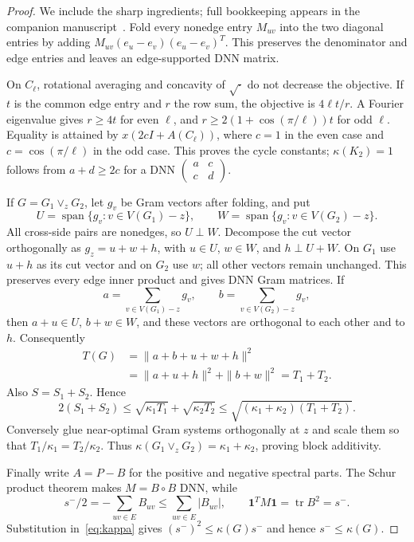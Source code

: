 \documentclass[11pt]{article}
\theoremstyle{remark}
\newcommand{\tr}{\operatorname{tr}}
\newcommand{\one}{\mathbf 1}
\begin{document}
\begin{proof}
We include the sharp ingredients; full bookkeeping appears in the companion
manuscript~\cite{SharpDNN}.  Fold every nonedge entry $M_{uv}$ into the two
diagonal entries by adding $M_{uv}(e_u-e_v)(e_u-e_v)^T$.  This preserves the
denominator and edge entries and leaves an edge-supported DNN matrix.

On $C_\ell$, rotational averaging and concavity of $\sqrt{\cdot}$ do not
decrease the objective.  If $t$ is the common edge entry and $r$ the row sum,
the objective is $4\ell t/r$.  A Fourier eigenvalue gives $r\geq4t$ for even
$\ell$, and $r\geq2(1+\cos(\pi/\ell))t$ for odd $\ell$.  Equality is attained
by $x(2cI+A(C_\ell))$, where $c=1$ in the even case and
$c=\cos(\pi/\ell)$ in the odd case.  This proves the cycle constants;
$\kappa(K_2)=1$ follows from $a+d\geq2c$ for a DNN
$\left(\begin{smallmatrix}a&c\\c&d\end{smallmatrix}\right)$.

If $G=G_1\vee_zG_2$, let $g_v$ be Gram vectors after folding, and put
\[
 U=\operatorname{span}\{g_v:v\in V(G_1)-z\},\qquad
 W=\operatorname{span}\{g_v:v\in V(G_2)-z\}.
\]
All cross-side pairs are nonedges, so $U\perp W$.  Decompose the cut vector
orthogonally as $g_z=u+w+h$, with $u\in U$, $w\in W$, and
$h\perp U+W$.  On $G_1$ use $u+h$ as its cut vector and on $G_2$ use $w$;
all other vectors remain unchanged.  This preserves every edge inner product
and gives DNN Gram matrices.  If
\[
 a=\sum_{v\in V(G_1)-z}g_v,\qquad
 b=\sum_{v\in V(G_2)-z}g_v,
\]
then $a+u\in U$, $b+w\in W$, and these vectors are orthogonal to each other
and to $h$.  Consequently
\[
 \begin{aligned}
 T(G)&=\|a+b+u+w+h\|^2\\
 &=\|a+u+h\|^2+\|b+w\|^2=T_1+T_2.
 \end{aligned}
\]
Also $S=S_1+S_2$.  Hence
\[
 2(S_1+S_2)\leq\sqrt{\kappa_1T_1}+\sqrt{\kappa_2T_2}
 \leq\sqrt{(\kappa_1+\kappa_2)(T_1+T_2)}.
\]
Conversely glue near-optimal Gram systems orthogonally at $z$ and scale them
so that $T_1/\kappa_1=T_2/\kappa_2$.  Thus
$\kappa(G_1\vee_zG_2)=\kappa_1+\kappa_2$, proving block additivity.

Finally write $A=P-B$ for the positive and negative spectral parts.  The
Schur product theorem makes $M=B\circ B$ DNN, while
\[
 s^-/2=-\sum_{uv\in E}B_{uv}\leq\sum_{uv\in E}|B_{uv}|,
 \qquad \one^TM\one=\tr B^2=s^-.
\]
Substitution in~\eqref{eq:kappa} gives $(s^-)^2\leq\kappa(G)s^-$ and hence
$s^-\leq\kappa(G)$.
\end{proof}
\end{document}
